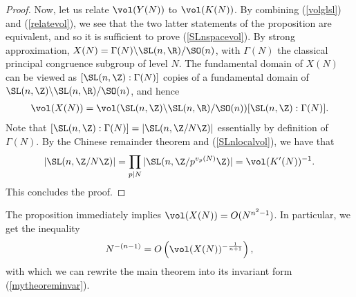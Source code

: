 \begin{proof}
Now, let us relate $\vol(Y(N))$ to $\vol(K(N))$. By combining (\ref{volglsl}) and (\ref{relatevol}), we see that the two latter statements of the proposition are equivalent, and so it is sufficient to prove (\ref{SLnspacevol}). By strong approximation, $X(N) =\Gamma(N)\backslash\SL(n,\R)/\SO(n)$, with $\Gamma(N)$ the classical principal congruence subgroup of level $N$. The fundamental domain of $X(N)$ can be viewed as $[\SL(n,\Z):\Gamma(N)]$ copies of a fundamental domain of $\SL(n,\Z)\backslash \SL(n,\R)/\SO(n)$, and hence
\begin{align*}
    \vol(X(N)) = \vol(\SL(n,\Z)\backslash \SL(n,\R)/\SO(n))[\SL(n,\Z):\Gamma(N)].
\end{align*}
Note that $[\SL(n,\Z):\Gamma(N)] = |\SL(n,\Z/N\Z)|$ essentially by definition of $\Gamma(N)$. By the Chinese remainder theorem and (\ref{SLnlocalvol}), we have that
\begin{align*}
    |\SL(n,\Z/N\Z)| = \prod_{p\mid N}|\SL(n,\Z/p^{v_p(N)}\Z)| = \vol(K'(N))^{-1}.
\end{align*}
This concludes the proof.
\end{proof}

\noindent The proposition immediately implies $\vol(X(N)) = O(N^{n^2-1})$. In particular, we get the inequality
\begin{align*}
    N^{-(n-1)}= O\left(\vol(X(N))^{-\frac{1}{n+1}}\right),
\end{align*}
with which we can rewrite the main theorem into its invariant form (\ref{mytheoreminvar}).
